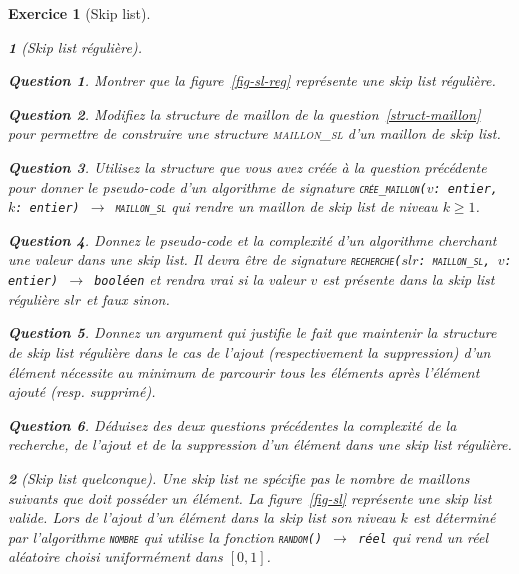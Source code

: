 \documentclass{article}
\theoremstyle{exostyle}
\newtheorem{exo}{Exercice}
\theoremstyle{partiestyle}
\newtheorem{partie}{}[exo]
\theoremstyle{questionstyle}
\newtheorem{questionpartie}{Question}[partie]
\begin{document}
\begin{exo}[Skip list]
\begin{partie}[\textit{Skip list} régulière]
        \begin{questionpartie}
            Montrer que la figure~\ref{fig-sl-reg} représente une \textit{skip list} régulière.
        \end{questionpartie}

        \begin{questionpartie}
            Modifiez la structure de maillon de la question~\ref{struct-maillon} pour permettre de construire une structure \textsc{maillon\_sl} d'un maillon de \textit{skip list}.
        \end{questionpartie}
        \begin{questionpartie}
            Utilisez la structure que vous avez créée à la question précédente pour donner le pseudo-code d'un algorithme de signature \texttt{\textsc{crée\_maillon}($v$: entier, $k$: entier) $\rightarrow$ \textsc{maillon\_sl}} qui rendre un maillon de \textit{skip list} de niveau $k\geq 1$.
        \end{questionpartie}
        \begin{questionpartie}
            \label{recherche-sl}
            Donnez le pseudo-code et la complexité d'un algorithme cherchant une valeur dans une \textit{skip list}. Il devra être de signature \texttt{\textsc{recherche}($slr$: \textsc{maillon\_sl}, $v$: entier) $\rightarrow$ booléen} et rendra vrai si la valeur $v$ est présente dans la \textit{skip list} régulière $slr$ et faux sinon.
        \end{questionpartie}
        \begin{questionpartie}
            Donnez un argument qui justifie le fait que maintenir la structure de \textit{skip list} régulière dans le cas de l'ajout (respectivement la suppression) d'un élément nécessite au minimum de parcourir tous les éléments après l'élément ajouté (\textit{resp.} supprimé).
        \end{questionpartie}
        \begin{questionpartie}
            Déduisez des deux questions précédentes la complexité de la recherche, de l'ajout et de la suppression d'un élément dans une \textit{skip list} régulière.
        \end{questionpartie}

    \end{partie}
    \begin{partie}[\textit{Skip list} quelconque]
        Une \textit{skip list} ne spécifie pas le nombre de maillons suivants que doit posséder un élément. La figure~\ref{fig-sl} représente une \textit{skip list} valide. Lors de l'ajout d'un élément dans la \textit{skip list} son niveau $k$ est déterminé par l'algorithme \texttt{\textsc{nombre}} qui utilise la fonction \texttt{\textsc{random}() $\rightarrow$ réel} qui rend un réel aléatoire choisi uniformément dans $[0, 1]$.


\end{partie}
\end{exo}
\end{document}

